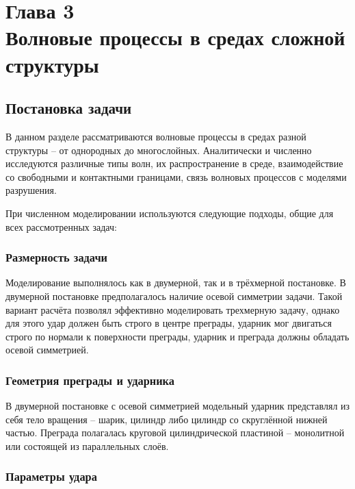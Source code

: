 \section*{Глава 3\\Волновые процессы в средах сложной структуры}
\setcounter{section}{3}
\setcounter{subsection}{0}
\setcounter{equation}{0}

\subsection{Постановка задачи}

В данном разделе рассматриваются волновые процессы в средах разной структуры -- от однородных до многослойных. Аналитически и численно исследуются различные типы волн, их распространение в среде, взаимодействие со свободными и контактными границами, связь волновых процессов с моделями разрушения.

При численном моделировании используются следующие подходы, общие для всех рассмотренных задач:

\subsubsection*{Размерность задачи}

Моделирование выполнялось как в двумерной, так и в трёхмерной постановке. В двумерной постановке предполагалось наличие осевой симметрии задачи. Такой вариант расчёта позволял эффективно моделировать трехмерную задачу, однако для этого удар должен быть строго в центре преграды, ударник мог двигаться строго по нормали к поверхности преграды, ударник и преграда должны обладать осевой симметрией.

\subsubsection*{Геометрия преграды и ударника}

В двумерной постановке с осевой симметрией модельный ударник представлял из себя тело вращения -- шарик, цилиндр либо цилиндр со скруглённой нижней частью. Преграда полагалась круговой цилиндрической пластиной -- монолитной или состоящей из параллельных слоёв.

\subsubsection*{Параметры удара}

